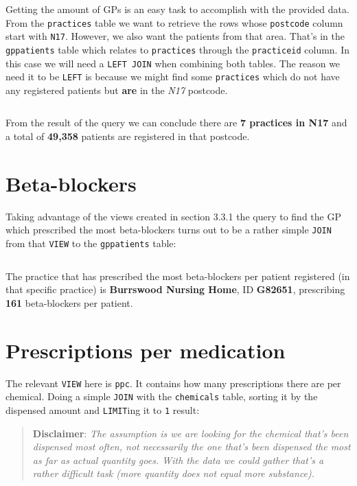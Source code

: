 \documentclass[english,a4paper,]{report}
\begin{document}
Getting the amount of GPs is an easy task to accomplish with the
provided data. From the \texttt{practices} table we want to retrieve the
rows whose \texttt{postcode} column start with \texttt{N17}. However, we
also want the patients from that area. That's in the \texttt{gppatients}
table which relates to \texttt{practices} through the
\texttt{practiceid} column. In this case we will need a
\texttt{LEFT\ JOIN} when combining both tables. The reason we need it to
be \texttt{LEFT} is because we might find some \texttt{practices} which
do not have any registered patients but \textbf{are} in the \emph{N17}
postcode.

\inputminted[firstline=5,lastline=15]{sql}{src/sql/02-queries.sql}

From the result of the query we can conclude there are \textbf{7
practices in N17} and a total of \textbf{49,358} patients are registered
in that postcode.

\section{Beta-blockers}\label{beta-blockers-1}

Taking advantage of the views created in section 3.3.1 the query to find
the GP which prescribed the most beta-blockers turns out to be a rather
simple \texttt{JOIN} from that \texttt{VIEW} to the \texttt{gppatients}
table:

\inputminted[firstline=27,lastline=39]{sql}{src/sql/02-queries.sql}

The practice that has prescribed the most beta-blockers per patient
registered (in that specific practice) is \textbf{Burrswood Nursing
Home}, ID \textbf{G82651}, prescribing \textbf{161} beta-blockers per
patient.

\section{Prescriptions per
medication}\label{prescriptions-per-medication}

The relevant \texttt{VIEW} here is \texttt{ppc}. It contains how many
prescriptions there are per chemical. Doing a simple \texttt{JOIN} with
the \texttt{chemicals} table, sorting it by the dispensed amount and
\texttt{LIMIT}ing it to \texttt{1} result:

\begin{quote}
\textbf{Disclaimer}: \emph{The assumption is we are looking for the
chemical that's been dispensed most often, not necessarily the one
that's been dispensed the most as far as actual quantity goes. With the
data we could gather that's a rather difficult task (more quantity does
not equal more substance).}
\end{quote}
\end{document}
